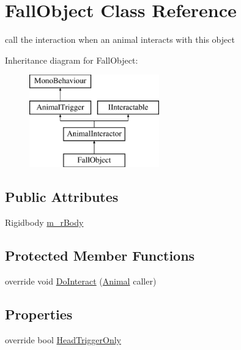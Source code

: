 \hypertarget{class_fall_object}{}\section{Fall\+Object Class Reference}
\label{class_fall_object}


call the interaction when an animal interacts with this object  


Inheritance diagram for Fall\+Object\+:\begin{figure}[H]
\begin{center}
\leavevmode
\includegraphics[height=4.000000cm]{class_fall_object}
\end{center}
\end{figure}
\subsection*{Public Attributes}
\begin{DoxyCompactItemize}
\item 
Rigidbody \mbox{\hyperlink{class_fall_object_ad3d5a0a0b2bf15fd9ad12a4b0acc4c8f}{m\+\_\+r\+Body}}
\end{DoxyCompactItemize}
\subsection*{Protected Member Functions}
\begin{DoxyCompactItemize}
\item 
override void \mbox{\hyperlink{class_fall_object_a5d796a5c10e490ce3bb5356b49eaae29}{Do\+Interact}} (\mbox{\hyperlink{class_animal}{Animal}} caller)
\end{DoxyCompactItemize}
\subsection*{Properties}
\begin{DoxyCompactItemize}
\item 
override bool \mbox{\hyperlink{class_fall_object_aebc6a71d3e9e237a19162996cc241ef0}{Head\+Trigger\+Only}}
\end{DoxyCompactItemize}
